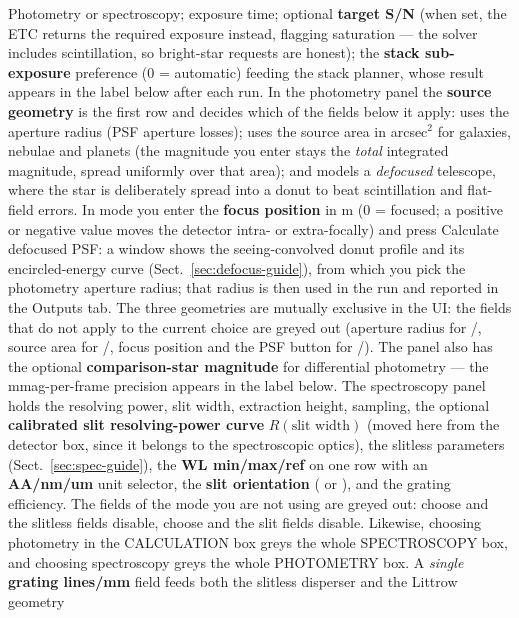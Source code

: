 Photometry or spectroscopy; exposure time; optional \textbf{target S/N}
(when set, the ETC returns the required exposure instead, flagging
saturation — the solver includes scintillation, so bright-star requests
are honest); the \textbf{stack sub-exposure} preference (0 = automatic)
feeding the stack planner, whose result appears in the label below after
each run. In the photometry panel the \textbf{source geometry} is the
first row and decides which of the fields below it apply: 
uses the aperture radius (PSF aperture losses);  uses the
source area in arcsec$^2$ for galaxies, nebulae and planets (the magnitude
you enter stays the \emph{total} integrated magnitude, spread uniformly
over that area); and  models a \emph{defocused} telescope,
where the star is deliberately spread into a donut to beat scintillation
and flat-field errors. In  mode you enter the
\textbf{focus position} in \textmu m (0 = focused; a positive or negative
value moves the detector intra- or extra-focally) and press
\textsf{Calculate defocused PSF}: a window shows the seeing-convolved donut
profile and its encircled-energy curve
(Sect.~\ref{sec:defocus-guide}), from which you pick the photometry
aperture radius; that radius is then used in the run and reported in the
Outputs tab. The three geometries are mutually exclusive in the UI: the
fields that do not apply to the current choice are greyed out (aperture
radius for /, source area for
/, focus position and the PSF button for
/). The panel also has the optional
\textbf{comparison-star magnitude} for differential photometry — the
mmag-per-frame precision appears in the label below. The spectroscopy
panel holds the resolving power, slit width, extraction height, sampling,
the optional \textbf{calibrated slit resolving-power curve} $R(\text{slit
width})$ (moved here from the detector box, since it belongs to the
spectroscopic optics), the slitless parameters
(Sect.~\ref{sec:spec-guide}), the \textbf{WL min/max/ref} on one row with
an \textbf{AA/nm/um} unit selector, the \textbf{slit orientation}
( or ), and the grating efficiency. The fields of the mode you are not using are greyed
out: choose  and the slitless fields disable, choose
 and the slit fields disable. Likewise, choosing photometry
in the CALCULATION box greys the whole SPECTROSCOPY box, and choosing
spectroscopy greys the whole PHOTOMETRY box. A \emph{single} \textbf{grating
lines/mm} field feeds both the slitless disperser and the Littrow geometry
